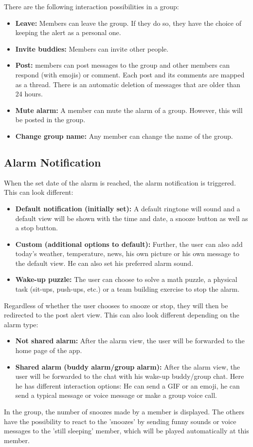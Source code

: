 \documentclass[conference]{IEEEtran}
\begin{document}
There are the following interaction possibilities in a group:
\begin{itemize}
    \item \textbf{Leave:} Members can leave the group. If they do so, they have the choice of keeping the alert as a personal one.
    \item \textbf{Invite buddies:} Members can invite other people.
    \item \textbf{Post:} members can post messages to the group and other members can respond (with emojis) or comment. Each post and its comments are mapped as a thread. There is an automatic deletion of messages that are older than 24 hours.
    \item \textbf{Mute alarm:} A member can mute the alarm of a group. However, this will be posted in the group.
    \item \textbf{Change group name:} Any member can change the name of the group.\\
\end{itemize}

\subsection{Alarm Notification}
When the set date of the alarm is reached, the alarm notification is triggered. This can look different:
\begin{itemize}
    \item \textbf{Default notification (initially set):} A default ringtone will sound and a default view will be shown with the time and date, a snooze button as well as a stop button. 
    \item \textbf{Custom (additional options to default):} Further, the user can also add today's weather, temperature, news, his own picture or his own message to the default view. He can also set his preferred alarm sound.
    \item \textbf{Wake-up puzzle:} The user can choose to solve a math puzzle, a physical task (sit-ups, push-ups, etc.) or a team building exercise to stop the alarm.\\

\end{itemize}
Regardless of whether the user chooses to snooze or stop, they will then be redirected to the post alert view. This can also look different depending on the alarm type:
\begin{itemize}
    \item \textbf{Not shared alarm:} After the alarm view, the user will be forwarded to the home page of the app.
    \item \textbf{Shared alarm (buddy alarm/group alarm):} After the alarm view, the user will be forwarded to the chat with his wake-up buddy/group chat. Here he has different interaction options: He can send a GIF or an emoji, he can send a typical message or voice message or make a group voice call.\\
\end{itemize}
In the group, the number of snoozes made by a member is displayed. The others have the possibility to react to the 'snoozes' by sending funny sounds or voice messages to the 'still sleeping' member, which will be played automatically at this member.
\end{document}
